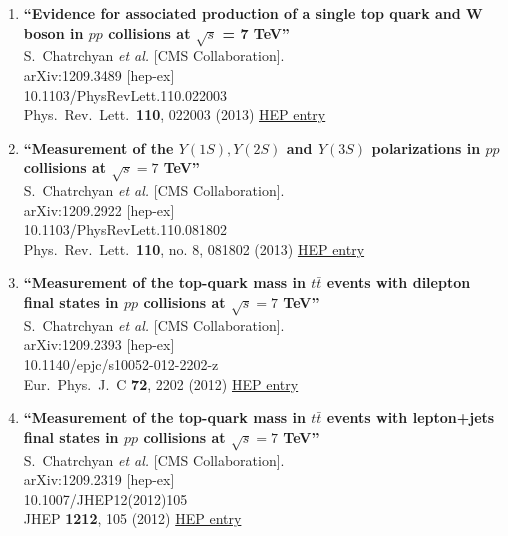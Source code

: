 \documentclass{article}
\begin{document}
\begin{enumerate}
\item%
{\bf ``Evidence for associated production of a single top quark and W boson in $pp$ collisions at $\sqrt{s}$ = 7 TeV''}
  \\{}S.~Chatrchyan {\it et al.} [CMS Collaboration].
  \\{}arXiv:1209.3489 [hep-ex]
    \\{}10.1103/PhysRevLett.110.022003
\\{}Phys.\ Rev.\ Lett.\  {\bf 110}, 022003 (2013) %
\href{http://inspirehep.net/record/1185781}{HEP entry}


\item%
{\bf ``Measurement of the $Y(1S), Y(2S)$ and $Y(3S)$ polarizations in $pp$ collisions at $\sqrt{s}=7$ TeV''}
  \\{}S.~Chatrchyan {\it et al.} [CMS Collaboration].
  \\{}arXiv:1209.2922 [hep-ex]
    \\{}10.1103/PhysRevLett.110.081802
\\{}Phys.\ Rev.\ Lett.\  {\bf 110}, no. 8, 081802 (2013) %
\href{http://inspirehep.net/record/1185414}{HEP entry}


\item%
{\bf ``Measurement of the top-quark mass in $t\bar{t}$ events with dilepton final states in $pp$ collisions at $\sqrt{s}=7$ TeV''}
  \\{}S.~Chatrchyan {\it et al.} [CMS Collaboration].
  \\{}arXiv:1209.2393 [hep-ex]
    \\{}10.1140/epjc/s10052-012-2202-z
\\{}Eur.\ Phys.\ J.\ C {\bf 72}, 2202 (2012) %
\href{http://inspirehep.net/record/1185104}{HEP entry}


\item%
{\bf ``Measurement of the top-quark mass in $t\bar{t}$ events with lepton+jets final states in $pp$ collisions at $\sqrt{s}=7$ TeV''}
  \\{}S.~Chatrchyan {\it et al.} [CMS Collaboration].
  \\{}arXiv:1209.2319 [hep-ex]
    \\{}10.1007/JHEP12(2012)105
\\{}JHEP {\bf 1212}, 105 (2012) %
\href{http://inspirehep.net/record/1185101}{HEP entry}



\end{enumerate}
\end{document}
